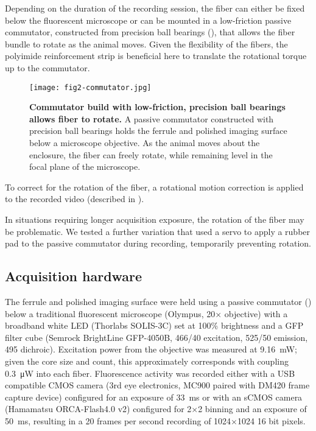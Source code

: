 Depending on the duration of the recording session, the 
fiber can either be fixed below the fluorescent microscope 
or can be mounted in a low-friction passive commutator,
constructed from precision ball bearings (), that allows 
the fiber bundle to rotate as the animal moves. Given the 
flexibility of the fibers, the polyimide reinforcement 
strip is beneficial here to translate the rotational 
torque up to the commutator.

\begin{figure}
\texttt{[image: fig2-commutator.jpg]}
\caption[Commutator for awake behaving recording]{\textbf{Commutator
build with low-friction, precision ball bearings allows fiber to 
rotate.} A passive commutator constructed with precision ball 
bearings holds the ferrule and polished imaging surface below 
a microscope objective. As the animal moves about the enclosure,
the fiber can freely rotate, while remaining level in the focal 
plane of the microscope.}
\label{fig:commutator}
\end{figure}

To correct for the rotation of the fiber, a rotational 
motion correction is applied to the recorded video 
(described in ).

In situations requiring longer acquisition exposure, the 
rotation of the fiber may be problematic. We tested a 
further variation that used a servo to apply a rubber pad 
to the passive commutator during recording, temporarily 
preventing rotation.

\subsection{Acquisition hardware}

The ferrule and polished imaging surface were held 
using a passive commutator () 
below a traditional fluorescent microscope (Olympus, 
20$\times$ objective) with a broadband white LED 
(Thorlabs SOLIS-3C) set at 100\% brightness and 
a GFP filter cube (Semrock BrightLine GFP-4050B, 
466/40 excitation, 525/50 emission, 495 dichroic). 
Excitation power from the objective was measured 
at 9.16~mW; given the core size and count, this 
approximately corresponds with coupling 
0.3~\si{\micro\watt} into each 
fiber. Fluorescence activity was recorded either 
with a USB compatible CMOS camera (3rd eye 
electronics, MC900 paired with DM420 frame capture 
device) configured for an exposure of 33~ms or with an 
sCMOS camera (Hamamatsu ORCA-Flash4.0 v2) configured 
for 2$\times$2 binning and an exposure of 50~ms, 
resulting in a 20 frames per second recording of 
1024$\times$1024 16 bit pixels.

